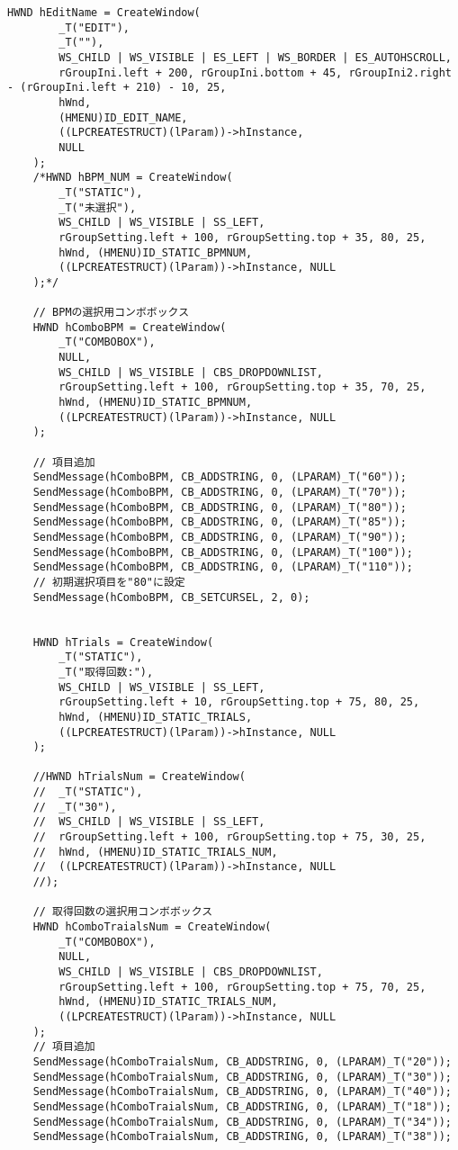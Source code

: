 \begin{lstlisting}[caption=window.cpp]
	HWND hEditName = CreateWindow(
		_T("EDIT"),
		_T(""),
		WS_CHILD | WS_VISIBLE | ES_LEFT | WS_BORDER | ES_AUTOHSCROLL,
		rGroupIni.left + 200, rGroupIni.bottom + 45, rGroupIni2.right - (rGroupIni.left + 210) - 10, 25,
		hWnd,
		(HMENU)ID_EDIT_NAME,
		((LPCREATESTRUCT)(lParam))->hInstance,
		NULL
	);
	/*HWND hBPM_NUM = CreateWindow(
		_T("STATIC"),
		_T("未選択"),
		WS_CHILD | WS_VISIBLE | SS_LEFT,
		rGroupSetting.left + 100, rGroupSetting.top + 35, 80, 25,
		hWnd, (HMENU)ID_STATIC_BPMNUM,
		((LPCREATESTRUCT)(lParam))->hInstance, NULL
	);*/

	// BPMの選択用コンボボックス
	HWND hComboBPM = CreateWindow(
		_T("COMBOBOX"),
		NULL,
		WS_CHILD | WS_VISIBLE | CBS_DROPDOWNLIST,
		rGroupSetting.left + 100, rGroupSetting.top + 35, 70, 25,
		hWnd, (HMENU)ID_STATIC_BPMNUM,
		((LPCREATESTRUCT)(lParam))->hInstance, NULL
	);

	// 項目追加
	SendMessage(hComboBPM, CB_ADDSTRING, 0, (LPARAM)_T("60"));
	SendMessage(hComboBPM, CB_ADDSTRING, 0, (LPARAM)_T("70"));
	SendMessage(hComboBPM, CB_ADDSTRING, 0, (LPARAM)_T("80"));
	SendMessage(hComboBPM, CB_ADDSTRING, 0, (LPARAM)_T("85"));
	SendMessage(hComboBPM, CB_ADDSTRING, 0, (LPARAM)_T("90"));
	SendMessage(hComboBPM, CB_ADDSTRING, 0, (LPARAM)_T("100"));
	SendMessage(hComboBPM, CB_ADDSTRING, 0, (LPARAM)_T("110"));
	// 初期選択項目を"80"に設定
	SendMessage(hComboBPM, CB_SETCURSEL, 2, 0);


	HWND hTrials = CreateWindow(
		_T("STATIC"),
		_T("取得回数:"),
		WS_CHILD | WS_VISIBLE | SS_LEFT,
		rGroupSetting.left + 10, rGroupSetting.top + 75, 80, 25,
		hWnd, (HMENU)ID_STATIC_TRIALS,
		((LPCREATESTRUCT)(lParam))->hInstance, NULL
	);

	//HWND hTrialsNum = CreateWindow(
	//	_T("STATIC"),
	//	_T("30"),
	//	WS_CHILD | WS_VISIBLE | SS_LEFT,
	//	rGroupSetting.left + 100, rGroupSetting.top + 75, 30, 25,
	//	hWnd, (HMENU)ID_STATIC_TRIALS_NUM,
	//	((LPCREATESTRUCT)(lParam))->hInstance, NULL
	//);

	// 取得回数の選択用コンボボックス
	HWND hComboTraialsNum = CreateWindow(
		_T("COMBOBOX"),
		NULL,
		WS_CHILD | WS_VISIBLE | CBS_DROPDOWNLIST,
		rGroupSetting.left + 100, rGroupSetting.top + 75, 70, 25,
		hWnd, (HMENU)ID_STATIC_TRIALS_NUM,
		((LPCREATESTRUCT)(lParam))->hInstance, NULL
	);
	// 項目追加
	SendMessage(hComboTraialsNum, CB_ADDSTRING, 0, (LPARAM)_T("20"));
	SendMessage(hComboTraialsNum, CB_ADDSTRING, 0, (LPARAM)_T("30"));
	SendMessage(hComboTraialsNum, CB_ADDSTRING, 0, (LPARAM)_T("40"));
	SendMessage(hComboTraialsNum, CB_ADDSTRING, 0, (LPARAM)_T("18"));
	SendMessage(hComboTraialsNum, CB_ADDSTRING, 0, (LPARAM)_T("34"));
	SendMessage(hComboTraialsNum, CB_ADDSTRING, 0, (LPARAM)_T("38"));



\end{lstlisting}
